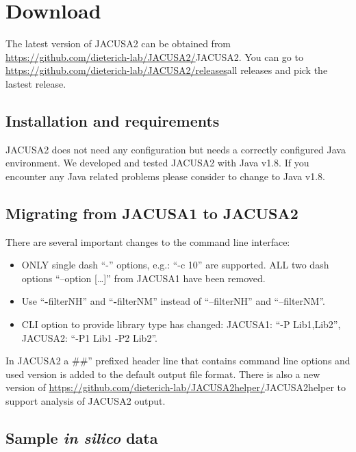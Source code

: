 \documentclass[10pt,a4paper]{article}
\begin{document}
\section{Download}
The latest version of JACUSA2 can be obtained from \url{https://github.com/dieterich-lab/JACUSA2/}{JACUSA2}.
You can go to \url{https://github.com/dieterich-lab/JACUSA2/releases}{all releases} and pick the lastest release.
\subsection{Installation and requirements}
JACUSA2 does not need any configuration but needs a correctly configured Java environment.
We developed and tested JACUSA2 with Java v1.8. If you encounter any Java related problems please
consider to change to Java v1.8.
\subsection{Migrating from JACUSA1 to JACUSA2}\label{sec:migration}
There are several important changes to the command line interface:
\begin{itemize}
  \item ONLY single dash ``-'' options, e.g.: ``-c 10'' are supported. ALL two dash options ``--option [\ldots]'' from JACUSA1 have been removed.
  \item Use ``\textbf{-}filterNH'' and ``\textbf{-}filterNM'' instead of ``--filterNH'' and ``--filterNM''.
	\item CLI option to provide library type has changed: JACUSA1: ``-P Lib1,Lib2'', JACUSA2: ``-P1 Lib1 -P2 Lib2''.
\end{itemize}
In JACUSA2 a \#\#'' prefixed header line that contains command line options and used version is added 
to the default output file format. There is also a new version of \url{https://github.com/dieterich-lab/JACUSA2helper/}{JACUSA2helper}
to support analysis of JACUSA2 output.
\subsection{Sample \textit{in silico} data}
\end{document}
